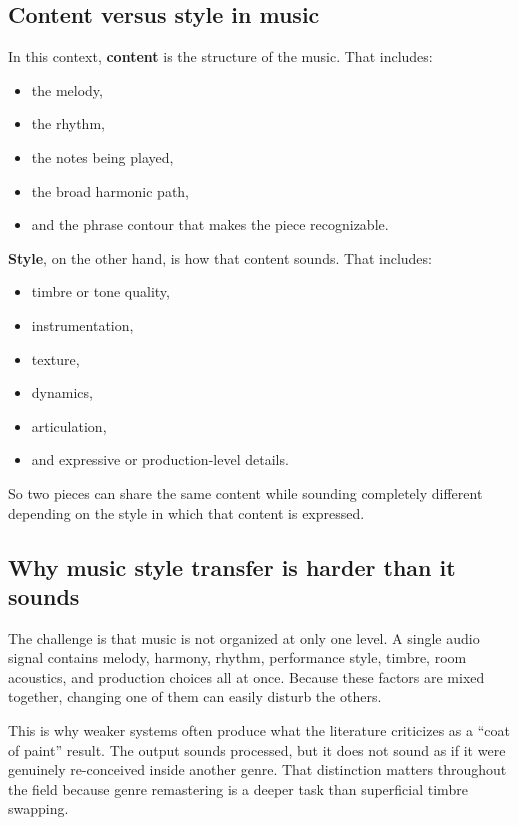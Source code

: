 \documentclass[11pt]{article}
\begin{document}
\subsection{Content versus style in music}

In this context, \textbf{content} is the structure of the music. That includes:

\begin{itemize}
\item the melody,
\item the rhythm,
\item the notes being played,
\item the broad harmonic path,
\item and the phrase contour that makes the piece recognizable.
\end{itemize}

\textbf{Style}, on the other hand, is how that content sounds. That includes:

\begin{itemize}
\item timbre or tone quality,
\item instrumentation,
\item texture,
\item dynamics,
\item articulation,
\item and expressive or production-level details.
\end{itemize}

So two pieces can share the same content while sounding completely different depending on the style in which that content is expressed.

\subsection{Why music style transfer is harder than it sounds}

The challenge is that music is not organized at only one level. A single audio signal contains melody, harmony, rhythm, performance style, timbre, room acoustics, and production choices all at once. Because these factors are mixed together, changing one of them can easily disturb the others.

This is why weaker systems often produce what the literature criticizes as a ``coat of paint'' result. The output sounds processed, but it does not sound as if it were genuinely re-conceived inside another genre. That distinction matters throughout the field because genre remastering is a deeper task than superficial timbre swapping.
\end{document}
